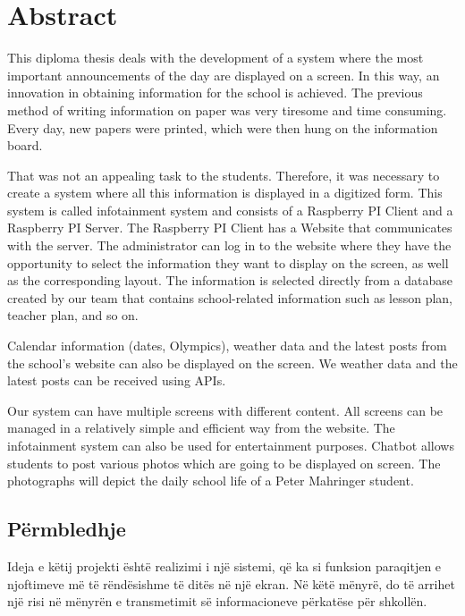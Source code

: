 \chapter*{Abstract}


This diploma thesis deals with the development of a system where the most important announcements of the day are displayed on a screen. In this way, an innovation in obtaining information for the school is achieved. The previous method of writing information on paper was very tiresome and time consuming. Every day, new papers were printed, which were then hung on the information board.  

That was not an appealing task to the students. Therefore, it was necessary to create a system where all this information is displayed in a digitized form. This system is called infotainment system and consists of a Raspberry PI Client and a Raspberry PI Server. The Raspberry PI Client has a Website that communicates with the server. The administrator can log in to the website where they have the opportunity to select the information they want to display on the screen, as well as the corresponding layout. The information is selected directly from a database created by our team that contains school-related information such as lesson plan, teacher plan, and so on.  

Calendar information (dates, Olympics), weather data and the latest posts from the school's website can also be displayed on the screen. We weather data and the latest posts can be received using APIs.  

Our system can have multiple screens with different content. All screens can be managed in a relatively simple and efficient way from the website. The infotainment system can also be used for entertainment purposes. Chatbot allows students to post various photos which are going to be displayed on screen. The photographs will depict the daily school life of a Peter Mahringer student.

\newpage
\section*{P\"{e}rmbledhje}

Ideja e k\"{e}tij projekti \"{e}sht\"{e} realizimi i nj\"{e} sistemi, q\"{e} ka si funksion paraqitjen e njoftimeve m\"{e} t\"{e} r\"{e}nd\"{e}sishme t\"{e} dit\"{e}s n\"{e} nj\"{e} ekran. N\"{e} k\"{e}t\"{e} m\"{e}nyr\"{e}, do t\"{e} arrihet nj\"{e} risi n\"{e} m\"{e}nyr\"{e}n e transmetimit s\"{e} informacioneve p\"{e}rkat\"{e}se p\"{e}r shkoll\"{e}n. 

